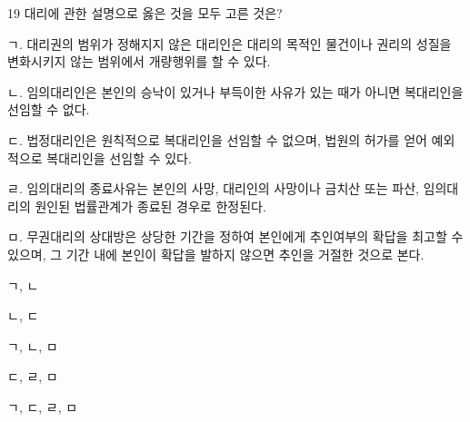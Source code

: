 \begin{question}{19}
대리에 관한 설명으로 옳은 것을 모두 고른 것은?
\begin{framedtext}
ㄱ. 대리권의 범위가 정해지지 않은 대리인은 대리의 목적인 물건이나 권리의 성질을 변화시키지 않는 범위에서 개량행위를 할 수 있다. \par
ㄴ. 임의대리인은 본인의 승낙이 있거나 부득이한 사유가 있는 때가 아니면 복대리인을 선임할 수 없다. \par
ㄷ. 법정대리인은 원칙적으로 복대리인을 선임할 수 없으며, 법원의 허가를 얻어 예외적으로 복대리인을 선임할 수 있다. \par
ㄹ. 임의대리의 종료사유는 본인의 사망, 대리인의 사망이나 금치산 또는 파산, 임의대리의 원인된 법률관계가 종료된 경우로 한정된다. \par
ㅁ. 무권대리의 상대방은 상당한 기간을 정하여 본인에게 추인여부의 확답을 최고할 수 있으며, 그 기간 내에 본인이 확답을 발하지 않으면 추인을 거절한 것으로 본다. \par
\end{framedtext}
\begin{choices}
  \item ㄱ, ㄴ
  \item ㄴ, ㄷ
  \item ㄱ, ㄴ, ㅁ
  \item ㄷ, ㄹ, ㅁ
  \item ㄱ, ㄷ, ㄹ, ㅁ
\end{choices}
\end{question}
